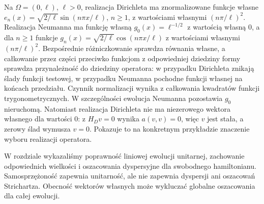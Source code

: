 \begin{przyklad}
Na $\Omega=(0,\ell)$, $\ell>0$, realizacja
Dirichleta ma znormalizowane funkcje własne
$e_n(x)=\sqrt{2/\ell}\sin(n\pi x/\ell)$, $n\ge1$,
z wartościami własnymi $(n\pi/\ell)^2$.
Realizacja Neumanna ma funkcję własną
$g_0(x)=\ell^{-1/2}$ z wartością własną $0$,
a dla $n\ge1$ funkcje
$g_n(x)=\sqrt{2/\ell}\cos(n\pi x/\ell)$
z wartościami własnymi $(n\pi/\ell)^2$.
Bezpośrednie różniczkowanie sprawdza równania
własne, a całkowanie przez części przeciwko
funkcjom z odpowiedniej dziedziny formy
sprawdza przynależność do dziedziny operatora:
w przypadku Dirichleta znikają ślady funkcji
testowej, w przypadku Neumanna pochodne
funkcji własnej na końcach przedziału.
Czynnik normalizacji wynika z całkowania
kwadratów funkcji trygonometrycznych.
W szczególności ewolucja Neumanna pozostawia
$g_0$ nieruchomą. Natomiast realizacja
Dirichleta nie ma niezerowego wektora własnego
dla wartości $0$: z $H_Dv=0$ wynika
$a(v,v)=0$, więc $v$ jest stała, a zerowy ślad
wymusza $v=0$. Pokazuje to na konkretnym
przykładzie znaczenie wyboru realizacji operatora.
\end{przyklad}

\noindent
W rozdziale wykazaliśmy poprawność liniowej ewolucji
unitarnej, zachowanie odpowiednich wielkości
i oszacowania dyspersyjne dla swobodnego hamiltonianu.
Samosprzężoność zapewnia unitarność, ale nie
zapewnia dyspersji ani oszacowań Strichartza.
Obecność wektorów własnych może wykluczać
globalne oszacowania dla całej ewolucji.
